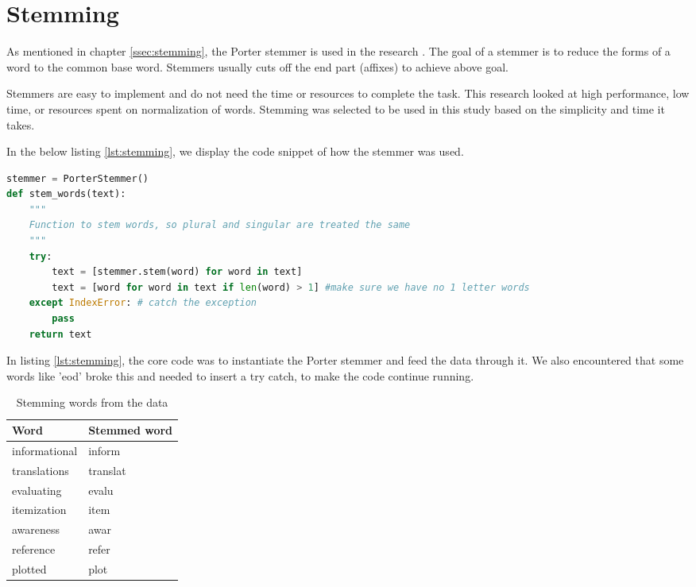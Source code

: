 \section{Stemming}
As mentioned in chapter \ref{ssec:stemming}, the Porter stemmer is used in the research \cite{porter1980algorithm}. The goal of a stemmer is to reduce the forms of a word to the common base word. Stemmers usually cuts off the end part (affixes) to achieve above goal. 

Stemmers are easy to implement and do not need the time or resources to complete the task. This research looked at high performance, low time, or resources spent on normalization of words. Stemming was selected to be used in this study based on the simplicity and time it takes.

In the below listing \ref{lst:stemming}, we display the code snippet of how the stemmer was used.

\begin{lstlisting}[language=Python, label={lst:stemming}, caption=Stemming the corpus]
stemmer = PorterStemmer()
def stem_words(text):
    """
    Function to stem words, so plural and singular are treated the same
    """
    try:
        text = [stemmer.stem(word) for word in text]
        text = [word for word in text if len(word) > 1] #make sure we have no 1 letter words
    except IndexError: # catch the exception
        pass
    return text

\end{lstlisting}

In listing \ref{lst:stemming}, the core code was to instantiate the Porter stemmer and feed the data through it. We also encountered that some words like 'eod' broke this and needed to insert a try catch, to make the code continue running. 

\begin{table}[htbp]
\centering
\begin{tabular}{|l|l|}
\hline
\textbf{Word} & \textbf{Stemmed word} \\ \hline
informational & inform \\ \hline
translations & translat \\ \hline
evaluating & evalu \\ \hline
itemization & item \\ \hline
awareness & awar \\ \hline
reference & refer \\ \hline
plotted & plot \\ \hline
\end{tabular}
\caption{Stemming words from the data}
\label{tab:stemming}
\end{table}

